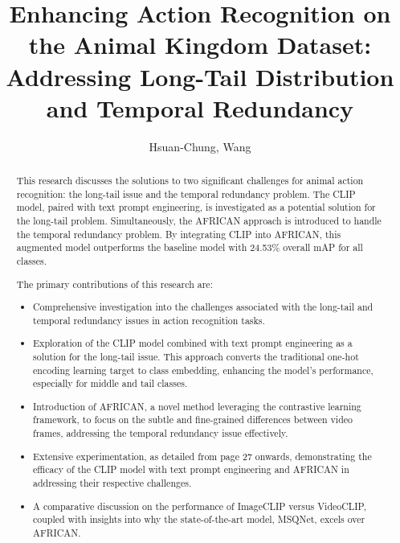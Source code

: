 \documentclass[
]{uob-thesis}
\title{Enhancing Action Recognition on the Animal Kingdom Dataset: Addressing Long-Tail Distribution and Temporal Redundancy}
\author{Hsuan-Chung, Wang}
\date{\printdatewithoutmonth{thesisdate}}
\begin{document}

\maketitle
\cleardoubleoddemptypage

\begin{abstract} %

This research discusses the solutions to two significant challenges for animal action recognition: the long-tail issue and the temporal redundancy problem. The CLIP model, paired with text prompt engineering, is investigated as a potential solution for the long-tail problem. Simultaneously, the AFRICAN approach is introduced to handle the temporal redundancy problem. By integrating CLIP into AFRICAN, this augmented model outperforms the baseline model with 24.53\% overall mAP for all classes.

The primary contributions of this research are:

\begin{itemize}
    \item Comprehensive investigation into the challenges associated with the long-tail and temporal redundancy issues in action recognition tasks.
    \item Exploration of the CLIP model combined with text prompt engineering as a solution for the long-tail issue. This approach converts the traditional one-hot encoding learning target to class embedding, enhancing the model's performance, especially for middle and tail classes.
    \item Introduction of AFRICAN, a novel method leveraging the contrastive learning framework, to focus on the subtle and fine-grained differences between video frames, addressing the temporal redundancy issue effectively.
    \item Extensive experimentation, as detailed from page 27 onwards, demonstrating the efficacy of the CLIP model with text prompt engineering and AFRICAN in addressing their respective challenges.
    \item A comparative discussion on the performance of ImageCLIP versus VideoCLIP, coupled with insights into why the state-of-the-art model, MSQNet, excels over AFRICAN.
\end{itemize}
\end{abstract}
\end{document}
